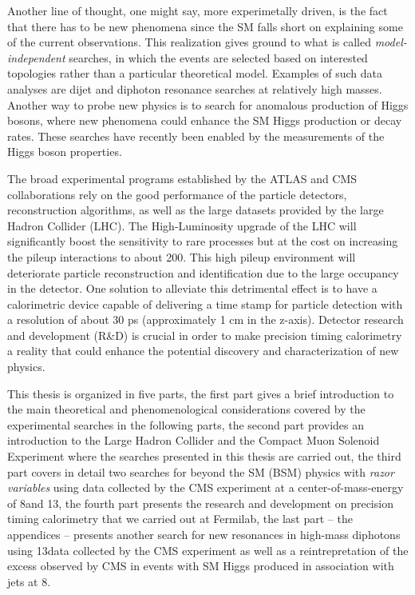 Another line of thought, one might say, more experimetally driven, is
the fact that there has to be new phenomena since the SM falls short
on explaining some of the current observations. This realization gives
ground to what is called \textit{model-independent} searches, in which
the events are selected based on interested topologies rather than a
particular theoretical model. Examples of such data analyses are dijet and
diphoton resonance searches at relatively high masses. Another way to
probe new physics is to search for anomalous production of Higgs
bosons, where new phenomena could enhance the SM Higgs production or
decay rates. These searches have recently been enabled by the
measurements of the Higgs boson properties.

The broad experimental programs established by the ATLAS and CMS
collaborations rely on the good performance of the particle detectors,
reconstruction algorithms, as well as the large datasets provided by
the large Hadron Collider (LHC). The High-Luminosity upgrade of the
LHC will significantly boost the sensitivity to rare processes but at
the cost on increasing the pileup interactions to about 200. This high
pileup environment will deteriorate particle reconstruction and
identification due to the large occupancy in the detector. One
solution to alleviate this detrimental effect is to have a
calorimetric device capable of delivering a time stamp for particle
detection with a resolution of about 30 ps (approximately 1 cm in the
z-axis). Detector research and  development (R\&D) is crucial in order
to make precision timing calorimetry a reality that could enhance the
potential discovery and characterization of new physics. 


This thesis is organized in five parts, the first part gives a brief
introduction to the main theoretical and phenomenological
considerations covered  by the experimental searches in the following
parts, the second part provides an introduction to the Large Hadron
Collider and the Compact Muon Solenoid Experiment where the searches
presented in this thesis are carried out, the third part covers in
detail two searches for beyond the SM (BSM) physics with \textit{razor variables} using data collected by
the CMS experiment at a center-of-mass-energy of 8\TeV and 13\TeV, the
fourth part presents the research and development on precision timing
calorimetry that we carried out at Fermilab, the last part -- the appendices
-- presents another search for new resonances in high-mass diphotons using 13\TeV data collected by the CMS experiment as well
as a reintrepretation of the excess observed by CMS in events with SM
Higgs produced in association with jets at 8\TeV.


